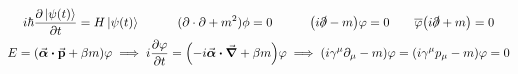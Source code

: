 \begin{gather*}
        i\hbar\pdv{\ket{\psi(t)}}{t} = H\ket{\psi(t)}
        \qquad\quad
        (\partial\cdot\partial + m^2)\phi = 0
        \qquad\quad
        \qty(i\slashed{\partial}-m)\varphi = 0
        \qquad
        \overline{\varphi}\qty(i\slashed{\partial}+m) = 0
        \\
        E = \qty(\va*{\alpha}\vdot\va{p} + \beta m)\varphi
        \implies
        i\pdv{\varphi}{t} = \qty(-i\va*{\alpha}\vdot\grad + \beta m)\varphi
        \implies
        \qty(i\gamma^\mu\partial_\mu - m)\varphi = \qty(i\gamma^\mu p_\mu - m)\varphi = 0
\end{gather*}
